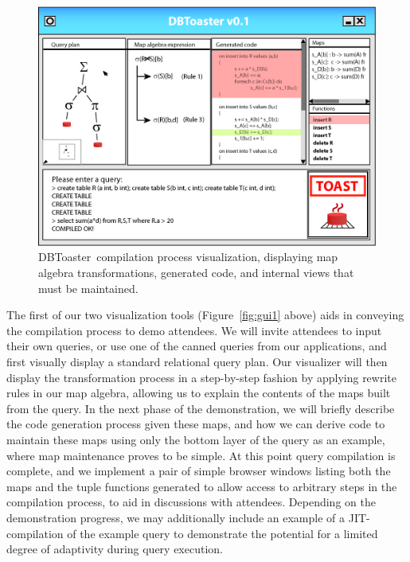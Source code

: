 \documentclass{vldb}
\newcommand{\compiler}{DBToaster}
\begin{document}
\begin{figure}
\begin{center}
\includegraphics[scale=0.47]{figures/gui1}
\end{center}
\caption{\compiler\ compilation process visualization, displaying map algebra
transformations, generated code, and internal views that must be maintained.}
\label{fig:compileguie}
\end{figure}

The first of our two visualization tools (Figure~\ref{fig:gui1} above) aids in
conveying the compilation process to demo attendees. We will invite attendees to
input their own queries, or use one of the canned queries from our applications,
and first visually display a standard relational query plan. Our visualizer will
then display the transformation process in a step-by-step fashion by applying
rewrite rules in our map algebra, allowing us to explain the contents of the maps
built from the query. In the next phase of the demonstration, we will briefly
describe the code generation process given these maps, and how we can derive code
to maintain these maps using only the bottom layer of the query as an example,
where map maintenance proves to be simple. At this point query compilation is
complete, and we implement a pair of simple browser windows listing both the maps
and the tuple functions generated to allow access to arbitrary steps in the
compilation process, to aid in discussions with attendees. Depending on the
demonstration progress, we may additionally include an example of a
JIT-compilation of the example query to demonstrate the potential for a limited
degree of adaptivity during query execution.
\end{document}
